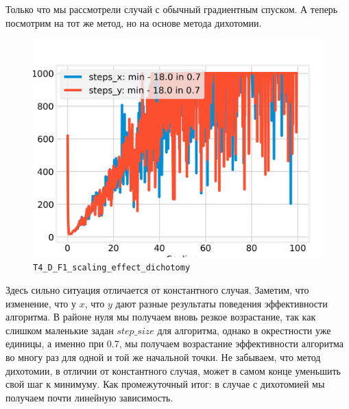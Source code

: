 \documentclass[12pt, a4paper, oneside, final]{article}
\begin{document}
	Только что мы рассмотрели случай с обычный градиентным спуском. А теперь посмотрим на тот же метод, но на основе метода дихотомии.
	\begin{figure}[H]
		\centering
		\includegraphics[scale=0.68]{Image/T4_D_F1_scaling_effect_dichotomy.png}
		\caption*{\texttt{T4\_D\_F1\_scaling\_effect\_dichotomy}}
	\end{figure}
	Здесь сильно ситуация отличается от константного случая. Заметим, что изменение, что у $x$, что $y$ дают разные результаты поведения эффективности алгоритма. В районе нуля мы получаем вновь резкое возрастание, так как слишком маленькие задан $step\_size$ для алгоритма, однако в окрестности уже единицы, а именно при $0.7$, мы получаем возрастание эффективности алгоритма во многу раз для одной и той же начальной точки. Не забываем, что метод дихотомии, в отличии от константного случая, может в самом конце уменьшить свой шаг к минимуму. Как промежуточный итог: в случае с дихотомией мы получаем почти линейную зависимость.
\end{document}
